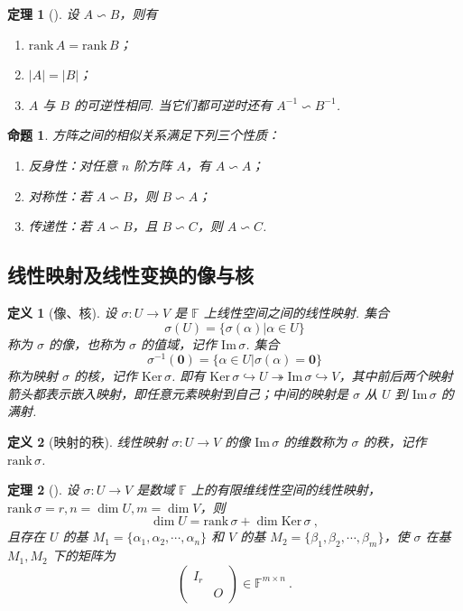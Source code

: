 \documentclass[zihao=-4,UTF8,linespread=1.8,nothm]{aytony_base}
\newtheorem{theorem}{\indent 定理}[subsection]
\newtheorem{proposition}{\indent 命题}[subsection]
\newtheorem{definition}{\indent 定义}[subsection]
\begin{document}
\begin{theorem}[]
    设 $A \backsim B$，则有
    \begin{enumerate}[nosep]
        \item $\mathrm{rank}\,A = \mathrm{rank}\,B$；
        \item $|A| = |B|$；
        \item $A$ 与 $B$ 的可逆性相同. 当它们都可逆时还有 $A^{-1} \backsim B^{-1}$.
    \end{enumerate}
\end{theorem}

\begin{proposition}
    方阵之间的相似关系满足下列三个性质：
    \begin{enumerate}[nosep]
        \item 反身性：对任意 $n$ 阶方阵 $A$，有 $A \backsim A$；
        \item 对称性：若 $A \backsim B$，则 $B \backsim A$；
        \item 传递性：若 $A \backsim B$，且 $B \backsim C$，则 $A \backsim C$.
    \end{enumerate}
\end{proposition}

\subsection{线性映射及线性变换的像与核}

\begin{definition}[像、核]
    设 $\sigma:U \to V$ 是 $\mathbb{F}$ 上线性空间之间的线性映射. 集合 $$
        \sigma(U) = \{\sigma(\alpha)|\alpha\in U\}
    $$ 称为 $\sigma$ 的像，也称为 $\sigma$ 的值域，记作 $\mathrm{Im}\,\sigma$. 集合 $$
        \sigma^{-1}(\mathbf{0}) = \{\alpha \in U|\sigma(\alpha) = \mathbf{0}\}
    $$ 称为映射 $\sigma$ 的核，记作 $\mathrm{Ker}\,\sigma$. 即有 $\mathrm{Ker}\,\sigma \hookrightarrow U \twoheadrightarrow \mathrm{Im}\,\sigma \hookrightarrow V$，其中前后两个映射箭头都表示嵌入映射，即任意元素映射到自己；中间的映射是 $\sigma$ 从 $U$ 到 $\mathrm{Im}\,\sigma$ 的满射.
\end{definition}

\begin{definition}[映射的秩]
    线性映射 $\sigma:U \to V$ 的像 $\mathrm{Im}\,\sigma$ 的维数称为 $\sigma$ 的秩，记作 $\mathrm{rank}\,\sigma$.
\end{definition}

\begin{theorem}[]
    设 $\sigma:U \to V$ 是数域 $\mathbb{F}$ 上的有限维线性空间的线性映射，$\mathrm{rank}\,\sigma = r, n = \dim U, m = \dim V$，则 $$
        \dim U = \mathrm{rank}\,\sigma + \dim \mathrm{Ker}\,\sigma\ ,
    $$ 且存在 $U$ 的基 $M_{1} = \{{\alpha}_1, {\alpha}_2, \cdots, {\alpha}_{n}\}$ 和 $V$ 的基 $M_2 = \{{\beta}_1, {\beta}_2, \cdots, {\beta}_{m}\}$，使 $\sigma$ 在基 $M_1, M_2$ 下的矩阵为 $$
        \left(
        \begin{matrix}
                I_r &   \\
                    & O
            \end{matrix}
        \right) \in \mathbb{F}^{m \times n}\ .
    $$
\end{theorem}
\end{document}
